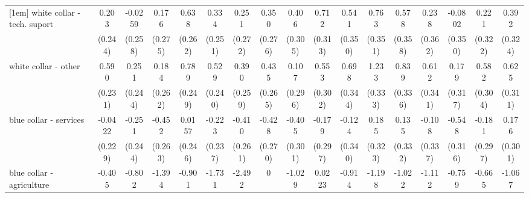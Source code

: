 {\begin{tabular}{l*{16}{c}}
[1em]
white collar - tech. suport&       0.203         &     -0.0259         &       0.176         &       0.638\sym{*}  &       0.334         &       0.251         &       0.350         &       0.406         &       0.712\sym{*}  &       0.541         &       0.763\sym{*}  &       0.578         &       0.238         &     -0.0802         &       0.221         &       0.392         \\
                    &     (0.244)         &     (0.258)         &     (0.275)         &     (0.262)         &     (0.251)         &     (0.272)         &     (0.276)         &     (0.305)         &     (0.313)         &     (0.350)         &     (0.351)         &     (0.358)         &     (0.362)         &     (0.350)         &     (0.322)         &     (0.324)         \\
[1em]
white collar - other&       0.590\sym{*}  &       0.251         &       0.184         &       0.789\sym{**} &       0.529\sym{*}  &       0.390         &       0.435         &       0.107         &       0.553         &       0.698\sym{*}  &       1.233\sym{***}&       0.839\sym{*}  &       0.612         &       0.179         &       0.582         &       0.625\sym{*}  \\
                    &     (0.231)         &     (0.244)         &     (0.262)         &     (0.249)         &     (0.240)         &     (0.259)         &     (0.265)         &     (0.296)         &     (0.302)         &     (0.344)         &     (0.333)         &     (0.336)         &     (0.341)         &     (0.317)         &     (0.304)         &     (0.311)         \\
[1em]
blue collar - services&     -0.0422         &      -0.251         &      -0.452         &      0.0157         &      -0.223         &      -0.410         &      -0.428         &      -0.405         &      -0.179         &      -0.124         &       0.185         &       0.135         &      -0.108         &      -0.548         &      -0.181         &       0.176         \\
                    &     (0.229)         &     (0.244)         &     (0.263)         &     (0.246)         &     (0.237)         &     (0.261)         &     (0.270)         &     (0.301)         &     (0.297)         &     (0.340)         &     (0.323)         &     (0.332)         &     (0.337)         &     (0.316)         &     (0.297)         &     (0.301)         \\
[1em]
blue collar - agriculture&      -0.405         &      -0.802         &      -1.394\sym{*}  &      -0.901         &      -1.731\sym{*}  &      -2.492\sym{*}  &           0         &      -1.029         &      0.0223         &      -0.914         &      -1.198         &      -1.022         &      -1.112         &      -0.759         &      -0.665         &      -1.067         \\

\end{tabular}}
